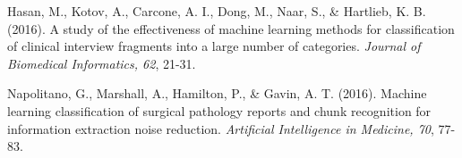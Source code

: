 \documentclass[12pt]{article}
\begin{document}
\begin{thebibliography}{99}
Hasan, M., Kotov, A., Carcone, A. I., Dong, M., Naar, S., \& Hartlieb,  K. B. (2016). A study of the effectiveness of machine learning methods for classification of clinical interview fragments into a large number of categories. \textit{Journal of Biomedical Informatics, 62}, 21-31.

Napolitano, G., Marshall, A., Hamilton, P., \& Gavin, A. T. (2016). Machine learning classification of surgical pathology reports and chunk recognition for information extraction noise reduction. \textit{Artificial Intelligence in Medicine, 70}, 77-83.





\end{thebibliography}
\end{document}
